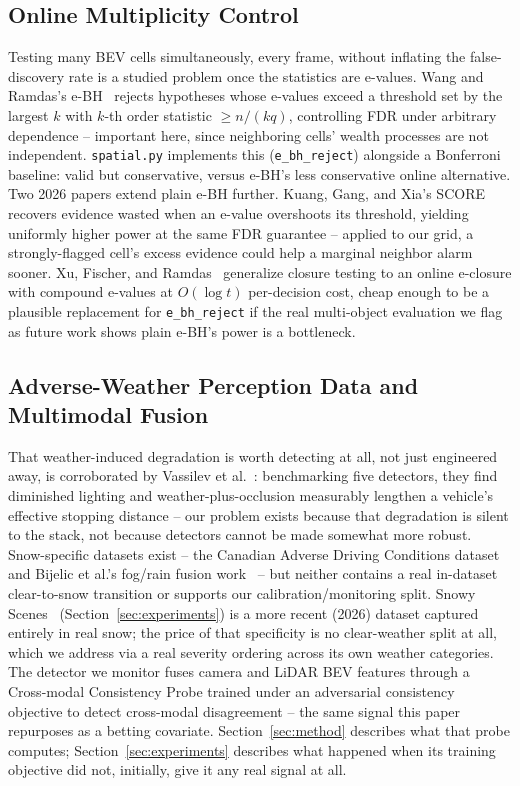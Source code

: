 \subsection{Online Multiplicity Control}

Testing many BEV cells simultaneously, every frame, without inflating the false-discovery rate is a studied problem once the statistics are e-values. Wang and Ramdas's e-BH~\cite{WangRamdas2022JRSSB} rejects hypotheses whose e-values exceed a threshold set by the largest $k$ with $k$-th order statistic $\ge n/(kq)$, controlling FDR under arbitrary dependence -- important here, since neighboring cells' wealth processes are not independent. \texttt{spatial.py} implements this (\texttt{e\_bh\_reject}) alongside a Bonferroni baseline: valid but conservative, versus e-BH's less conservative online alternative. Two 2026 papers extend plain e-BH further. Kuang, Gang, and Xia's SCORE~\cite{Kuang2026SCORE} recovers evidence wasted when an e-value overshoots its threshold, yielding uniformly higher power at the same FDR guarantee -- applied to our grid, a strongly-flagged cell's excess evidence could help a marginal neighbor alarm sooner. Xu, Fischer, and Ramdas~\cite{Xu2026EClosure} generalize closure testing to an online e-closure with compound e-values at $O(\log t)$ per-decision cost, cheap enough to be a plausible replacement for \texttt{e\_bh\_reject} if the real multi-object evaluation we flag as future work shows plain e-BH's power is a bottleneck.

\subsection{Adverse-Weather Perception Data and Multimodal Fusion}

That weather-induced degradation is worth detecting at all, not just engineered away, is corroborated by Vassilev et al.~\cite{Vassilev2026Sensitivity}: benchmarking five detectors, they find diminished lighting and weather-plus-occlusion measurably lengthen a vehicle's effective stopping distance -- our problem exists because that degradation is silent to the stack, not because detectors cannot be made somewhat more robust. Snow-specific datasets exist -- the Canadian Adverse Driving Conditions dataset~\cite{Pitropov2021CADC} and Bijelic et al.'s fog/rain fusion work~\cite{Bijelic2020SeeingThroughFog} -- but neither contains a real in-dataset clear-to-snow transition or supports our calibration/monitoring split. Snowy Scenes~\cite{SnowyScenes2026} (Section~\ref{sec:experiments}) is a more recent (2026) dataset captured entirely in real snow; the price of that specificity is no clear-weather split at all, which we address via a real severity ordering across its own weather categories. The detector we monitor fuses camera and LiDAR BEV features through a Cross-modal Consistency Probe trained under an adversarial consistency objective to detect cross-modal disagreement -- the same signal this paper repurposes as a betting covariate. Section~\ref{sec:method} describes what that probe computes; Section~\ref{sec:experiments} describes what happened when its training objective did not, initially, give it any real signal at all.
